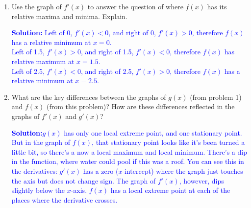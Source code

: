 \documentclass[letterpaper,11pt]{article}
\newcommand{\sol}[2]{\begin{minipage}[c][#1]{\linewidth}{\textcolor{blue}{\textbf{Solution:}}\quad \textcolor{blue}{#2}}\end{minipage}}
\newcommand{\sol}[2]{\begin{minipage}[c][#1]{\linewidth}{\vfill}\end{minipage}}
\begin{document}
\begin{enumerate}
\begin{enumerate}
\item Use the graph of $f'(x)$ to answer the question of where $f(x)$ has its relative maxima and minima.  Explain.

\sol{1.1 in}{
Left of 0, $f'(x)<0$, and right of 0, $f'(x)>0$, therefore $f(x)$ has a relative minimum at $x=0$. \\
Left of 1.5, $f'(x)>0$, and right of 1.5, $f'(x)<0$, therefore $f(x)$ has relative maximum at $x=1.5$. \\
Left of 2.5, $f'(x)<0$, and right of 2.5, $f'(x)>0$, therefore $f(x)$ has a relative minimum at $x=2.5$.}

\item What are the key differences between the graphs of $g(x)$ (from problem 1) and $f(x)$ (from this problem)?  How are these differences reflected in the graphs of $f'(x)$ and $g'(x)$?

\sol{1.2in}{$g(x)$ has only one local extreme point, and one stationary point.  But in the graph of $f(x)$, that stationary point looks like it's been turned a little bit, so there's a now a local maximum and local minimum.  There's a dip in the function, where water could pool if this was a roof.  You can see this in the derivatives: $g'(x)$ has a zero ($x$-intercept) where the graph just touches the axis but does not change sign. The graph of $f'(x)$, however, dips slightly below the $x$-axis.  $f(x)$ has a local extreme point at each of the places where the derivative crosses.}
\end{enumerate}




\end{enumerate}
\end{document}
